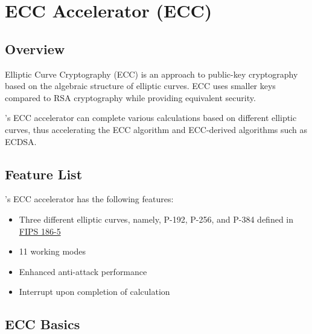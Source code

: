 \documentclass[main\_\_EN.tex]{subfiles}
\begin{document}

\ifglobal
\else
    \listoftodos
    {\let\clearpage\relax \listofdonetodos}
    \tableofcontents
\fi



\hypertarget{ecc}{}
\chapter{ECC Accelerator (ECC)}
\label{mod:ecc}

\section{Overview}

Elliptic Curve Cryptography (ECC) is an approach to public-key cryptography based on the algebraic structure of elliptic curves. ECC uses smaller keys compared to RSA cryptography while providing equivalent security.

\chipname{}'s ECC accelerator can complete various calculations based on different elliptic curves, thus accelerating the ECC algorithm and ECC-derived algorithms such as ECDSA.

\section{Feature List}

\chipname{}'s ECC accelerator has the following features:

\begin{itemize}
    \item Three different elliptic curves, namely, P-192, P-256, and P-384 defined in \href{https://nvlpubs.nist.gov/nistpubs/FIPS/NIST.FIPS.186-5.pdf}{FIPS 186-5}
    \item 11 working modes
    \item Enhanced anti-attack performance
    \item Interrupt upon completion of calculation
\end{itemize}

\section{ECC Basics}
\end{document}
